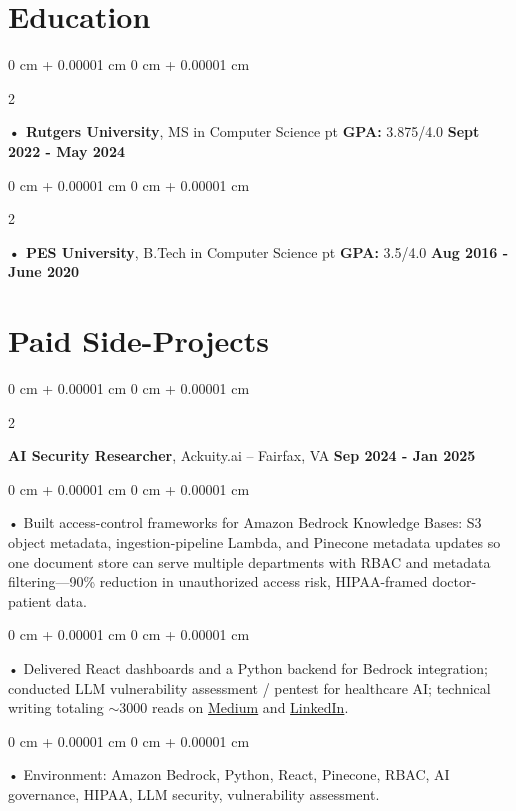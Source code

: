 \documentclass[10pt, letterpaper]{article}
\newenvironment{onecolentry}{
    \begin{adjustwidth}{
        0 cm + 0.00001 cm
    }{
        0 cm + 0.00001 cm
    }
}{
    \end{adjustwidth}
} %
\newenvironment{twocolentry}[2][]{
    \onecolentry
    \def\secondColumn{#2}
    \setcolumnwidth{\fill, 4.5 cm}
    \begin{paracol}{2}
}{
    \switchcolumn \raggedleft \secondColumn
    \end{paracol}
    \endonecolentry
} %
\begin{document}
        \section{Education}
        \vspace{2 pt }
        \begin{twocolentry}{
            \textbf{Sept 2022 - May 2024}
        }
            \textbf{ • Rutgers University}, MS in Computer Science  pt \textbf{GPA:} 3.875/4.0  \end{twocolentry}

        \begin{twocolentry}{
            \textbf{Aug 2016 - June 2020}
        }
            \textbf{ • PES University}, B.Tech in Computer Science  pt \textbf{GPA:} 3.5/4.0  \end{twocolentry}

    \section{Paid Side-Projects}
            \vspace{2 pt }
                    \begin{twocolentry}{
            \textbf{Sep 2024 - Jan 2025}
        }
            \textbf{AI Security Researcher}, Ackuity.ai -- Fairfax, VA\end{twocolentry}

        \begin{onecolentry}
             • Built access-control frameworks for Amazon Bedrock Knowledge Bases: S3 object metadata, ingestion-pipeline Lambda, and Pinecone metadata updates so one document store can serve multiple departments with RBAC and metadata filtering---90\% reduction in unauthorized access risk, HIPAA-framed doctor-patient data.
        \end{onecolentry}
        \begin{onecolentry}
             • Delivered React dashboards and a Python backend for Bedrock integration; conducted LLM vulnerability assessment / pentest for healthcare AI; technical writing totaling $\sim$3000 reads on \href{https://medium.com/@sreenikethaathreya/building-a-permission-aware-genai-application-on-amazon-bedrock-8fdc2410dd43}{Medium} and \href{https://www.linkedin.com/pulse/building-permission-aware-genai-application-amazon-bedrock-aathreya-g7nme/}{LinkedIn}.
        \end{onecolentry}
        \begin{onecolentry}
             • Environment: Amazon Bedrock, Python, React, Pinecone, RBAC, AI governance, HIPAA, LLM security, vulnerability assessment.
        \end{onecolentry}
\end{document}
